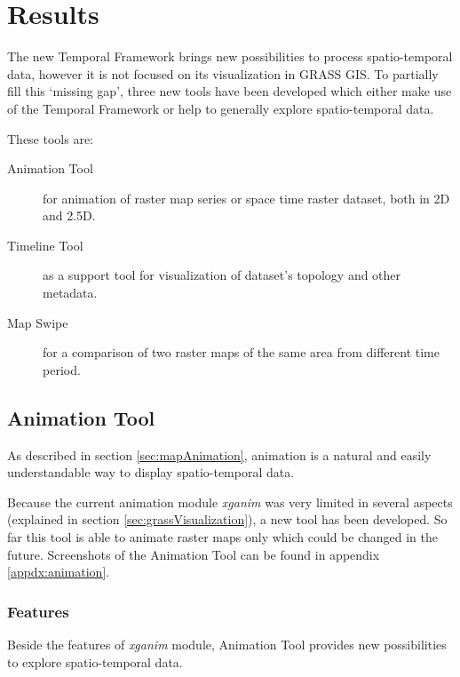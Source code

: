 \documentclass[a4paper,12pt,oneside]{book}
\newcommand{\module}[1]{\textsl{#1}}
\newcommand{\tf}{Temporal Framework\xspace}
\newcommand{\at}{Animation Tool\xspace}
\newcommand{\ms}{Map Swipe\xspace}
\begin{document}



\chapter{Results}%
\label{chap:results}
The new \tf brings new possibilities to process spatio-temporal data,
however it is not focused on its visualization in GRASS GIS. To partially fill this `missing gap',
three new tools have been developed which either make use of the \tf
or help to generally explore spatio-temporal data.

These tools are:
\begin{description}
    \item[\at]for animation of raster map series or space time raster dataset, both in 2D and 2.5D.
    \item[Timeline Tool] as a support tool for visualization of dataset's topology and other metadata.
    \item[\ms]for a comparison of two raster maps of the same area from different time period.
\end{description}

\section{\at}
\label{sec:animationTool}
As described in section \ref{sec:mapAnimation},
animation is a natural and easily understandable way to display spatio-temporal data.

Because the current animation module \module{xganim} was very limited
in several aspects (explained in section \ref{sec:grassVisualization}),
a new tool has been developed. So far this tool is able to animate raster maps
only which could be changed in the future.
Screenshots of the \at can be found in appendix \ref{appdx:animation}.

\subsection{Features}
Beside the features of \module{xganim} module, \at provides new possibilities
to explore spatio-temporal data.
\end{document}
